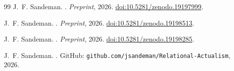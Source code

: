 \documentclass[11pt,a4paper]{article}
\begin{document}
\begin{thebibliography}{99}
J.~F. Sandeman.
.
\newblock \textit{Preprint}, 2026.
\newblock \href{https://doi.org/10.5281/zenodo.19197999}{doi:10.5281/zenodo.19197999}.

J.~F. Sandeman.
.
\newblock \textit{Preprint}, 2026.
\newblock \href{https://doi.org/10.5281/zenodo.19198513}{doi:10.5281/zenodo.19198513}.

J.~F. Sandeman.
.
\newblock \textit{Preprint}, 2026.
\newblock \href{https://doi.org/10.5281/zenodo.19198285}{doi:10.5281/zenodo.19198285}.

J.~F. Sandeman.
.
\newblock GitHub: \texttt{github.com/jsandeman/Relational-Actualism}, 2026.

\end{thebibliography}
\end{document}
